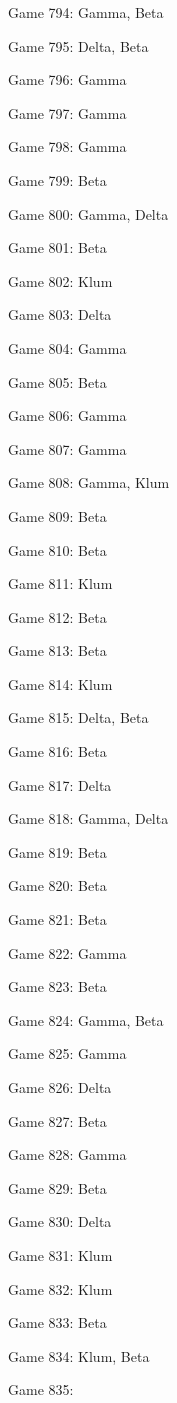 \documentclass{article}
\begin{document}
\begin{multicols}{3}
\begin{compactitem}
\item Game 794:
Gamma, Beta
\item Game 795:
Delta, Beta
\item Game 796:
Gamma
\item Game 797:
Gamma
\item Game 798:
Gamma
\item Game 799:
Beta
\item Game 800:
Gamma, Delta
\item Game 801:
Beta
\item Game 802:
Klum
\item Game 803:
Delta
\item Game 804:
Gamma
\item Game 805:
Beta
\item Game 806:
Gamma
\item Game 807:
Gamma
\item Game 808:
Gamma, Klum
\item Game 809:
Beta
\item Game 810:
Beta
\item Game 811:
Klum
\item Game 812:
Beta
\item Game 813:
Beta
\item Game 814:
Klum
\item Game 815:
Delta, Beta
\item Game 816:
Beta
\item Game 817:
Delta
\item Game 818:
Gamma, Delta
\item Game 819:
Beta
\item Game 820:
Beta
\item Game 821:
Beta
\item Game 822:
Gamma
\item Game 823:
Beta
\item Game 824:
Gamma, Beta
\item Game 825:
Gamma
\item Game 826:
Delta
\item Game 827:
Beta
\item Game 828:
Gamma
\item Game 829:
Beta
\item Game 830:
Delta
\item Game 831:
Klum
\item Game 832:
Klum
\item Game 833:
Beta
\item Game 834:
Klum, Beta
\item Game 835:

\end{compactitem}
\end{multicols}
\end{document}
